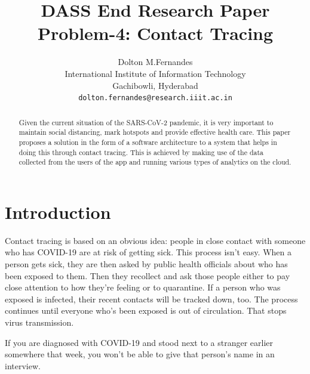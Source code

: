 \documentclass[10pt,twocolumn,letterpaper]{article}
\begin{document}
\title{DASS End Research Paper\\Problem-4: Contact Tracing}

\author{Dolton M.Fernandes\\
International Institute of Information Technology\\
Gachibowli, Hyderabad\\
{\tt\small dolton.fernandes@research.iiit.ac.in}
}

\maketitle

\begin{abstract}

   Given the current situation of the SARS-CoV-2 pandemic, it is very important to maintain social distancing, mark hotspots and provide effective health care. This paper proposes a solution in the form of a software architecture to a system that helps in doing this through contact tracing. This is achieved by making use of the data collected from the users of the app and running various types of analytics on the cloud.

\end{abstract}

\section{Introduction}

Contact tracing is based on an obvious idea: people in close contact with someone who has COVID-19 are at risk of getting sick. This process isn’t easy. When a person gets sick, they are then asked by public health officials about who has been exposed to them. Then they recollect and ask those people either to pay close attention to how they’re feeling or to quarantine. If a person who was exposed is infected, their recent contacts will be tracked down, too. The process continues until everyone who’s been exposed is out of circulation. That stops virus transmission.

If you are diagnosed with COVID-19 and stood next to a stranger earlier somewhere that week, you won’t be able to give that person’s name in an interview.
\end{document}
